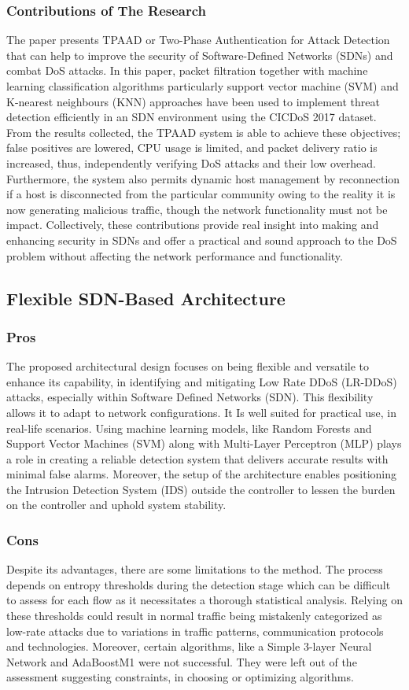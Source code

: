 \documentclass[a4paper, 12pt]{article}
\begin{document}
\subsubsection{Contributions of The Research}
The paper presents TPAAD or Two-Phase Authentication for Attack Detection that can help to improve the security of Software-Defined Networks (SDNs) and combat DoS attacks. In this paper, packet filtration together with machine learning classification algorithms particularly support vector machine (SVM) and K-nearest neighbours (KNN) approaches have been used to implement threat detection efficiently in an SDN environment using the CICDoS 2017 dataset. From the results collected, the TPAAD system is able to achieve these objectives; false positives are lowered, CPU usage is limited, and packet delivery ratio is increased, thus, independently verifying DoS attacks and their low overhead. Furthermore, the system also permits dynamic host management by reconnection if a host is disconnected from the particular community owing to the reality it is now generating malicious traffic, though the network functionality must not be impact. Collectively, these contributions provide real insight into making and enhancing security in SDNs and offer a practical and sound approach to the DoS problem without affecting the network performance and functionality. 

\subsection{Flexible SDN-Based Architecture}
\subsubsection{Pros}
The proposed architectural design focuses on being flexible and versatile to enhance its capability, in identifying and mitigating Low Rate DDoS (LR-DDoS) attacks, especially within Software Defined Networks (SDN). This flexibility allows it to adapt to network configurations. It Is well suited for practical use, in real-life scenarios. Using machine learning models, like Random Forests and Support Vector Machines (SVM) along with Multi-Layer Perceptron (MLP) plays a role in creating a reliable detection system that delivers accurate results with minimal false alarms. Moreover, the setup of the architecture enables positioning the Intrusion Detection System (IDS) outside the controller to lessen the burden on the controller and uphold system stability. 
\subsubsection{Cons}
Despite its advantages, there are some limitations to the method. The process depends on entropy thresholds during the detection stage which can be difficult to assess for each flow as it necessitates a thorough statistical analysis. Relying on these thresholds could result in normal traffic being mistakenly categorized as low-rate attacks due to variations in traffic patterns, communication protocols and technologies. Moreover, certain algorithms, like a Simple 3-layer Neural Network and AdaBoostM1 were not successful. They were left out of the assessment suggesting constraints, in choosing or optimizing algorithms.
\end{document}
